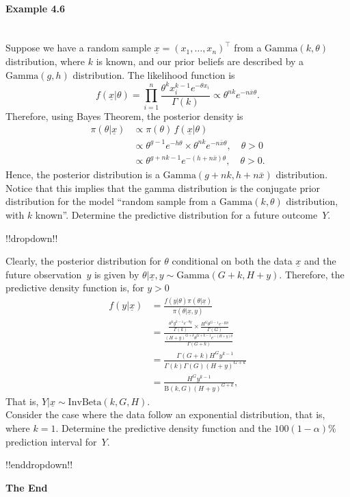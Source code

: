 \clearpage

\paragraph{Example 4.6}{~\\
  Suppose we have a random sample $\underline{x} = (x_1, \ldots, x_n)^\top$ from a $\mathrm{Gamma}(k,\theta)$
  distribution, where $k$ is known, and our prior beliefs are
  described by a $\mathrm{Gamma}(g,h)$ distribution. The likelihood function is
$$ f(\underline{x}|\theta)=\prod_{i=1}^n \frac{\theta^k x_i^{k-1}e^{-\theta x_i}}{\Gamma(k)}\propto\theta^{nk}e^{-n\bar x\theta}.$$
 Therefore, using Bayes Theorem, the posterior density is
 \begin{align*}
  \pi(\theta|\underline{x}) &\propto\pi(\theta)\,f(\underline{x}|\theta) \\
  &\propto\theta^{g-1}e^{-h\theta}\times\theta^{nk}e^{-n\bar x\theta}, \quad\theta>0 \\
  &\propto\theta^{g+nk-1}e^{-(h+n\bar x)\theta},\quad\theta>0.
\end{align*}
Hence, the posterior distribution is a $\mathrm{Gamma}(g+nk,h+n\bar x)$ distribution. Notice that this implies that the gamma distribution is the conjugate prior distribution for the model ``random sample from a $\mathrm{Gamma}(k,\theta)$ distribution, with $k$ known''. Determine the predictive distribution for a future outcome~$Y$.



\clearpage

!!dropdown!!

Clearly, the posterior distribution for $\theta$ conditional on both
    the data $\underline{x}$ and the future observation~$y$ is given by
    $\theta|\underline{x},y\sim \mathrm{Gamma}(G+k,H+y)$. Therefore, the predictive density
    function is, for $y>0$
    \begin{align*}
    f(y|\underline{x})&=\frac{f(y|\theta)\pi(\theta|\underline{x})}{\pi(\theta|\underline{x},y)}\\
    {}
    &=\frac{\frac{\theta^k y^{k-1}e^{-\theta y}}{\Gamma(k)}
    \times \frac{H^G\theta^{G-1}e^{-H\theta}}{\Gamma(G)}}
    {\frac{(H+y)^{G+k}\theta^{G+k-1}e^{-(H+y)\theta}}{\Gamma(G+k)}}\\
    {}
    &=\frac{\Gamma(G+k)H^Gy^{k-1}}{\Gamma(k)\Gamma(G)(H+y)^{G+k}}\\ 
    {}
    &=\frac{H^Gy^{k-1}}{\mathrm{B}(k,G)(H+y)^{G+k}},
    \end{align*}
    That is, $Y|\underline{x}\sim \mathrm{InvBeta}(k,G,H)$. \\ 
    Consider the case where the data follow an exponential distribution, that is, where $k=1$. Determine the predictive density function and the $100(1-\alpha)\%$ prediction interval for~$Y$.

!!enddropdown!!}

\clearpage

\thispagestyle{empty}
\vspace*{0.25\textheight}

\bfseries\fontsize{60pt}{60pt}\selectfont The End
